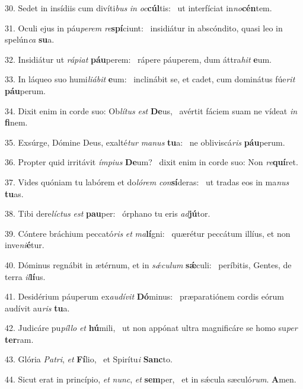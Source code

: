 30. Sedet in insídiis cum divíti\textit{bus} \textit{in} \textit{oc}\textbf{cúl}tis: \ast\  ut interfíciat in\textit{no}\textbf{cén}tem.\

31. Oculi ejus in páu\textit{pe}\textit{rem} \textit{re}\textbf{spí}ciunt: \ast\  insidiátur in abscóndito, quasi leo in spelún\textit{ca} \textbf{su}a.\

32. Insidiátur ut \textit{rá}\textit{pi}\textit{at} \textbf{páu}perem: \ast\  rápere páuperem, dum áttra\textit{hit} \textbf{e}um.\

33. In láqueo suo humi\textit{li}\textit{á}\textit{bit} \textbf{e}um: \ast\  inclinábit se, et cadet, cum dominátus fúe\textit{rit} \textbf{páu}perum.\

34. Dixit enim in corde suo: Ob\textit{lí}\textit{tus} \textit{est} \textbf{De}us, \ast\  avértit fáciem suam ne vídeat \textit{in} \textbf{fi}nem.\

35. Exsúrge, Dómine Deus, exalté\textit{tur} \textit{ma}\textit{nus} \textbf{tu}a: \ast\  ne obliviscá\textit{ris} \textbf{páu}perum.\

36. Propter quid irritávit \textit{ím}\textit{pi}\textit{us} \textbf{De}um? \ast\  dixit enim in corde suo: Non \textit{re}\textbf{quí}ret.\

37. Vides quóniam tu labórem et do\textit{ló}\textit{rem} \textit{con}\textbf{sí}deras: \ast\  ut tradas eos in ma\textit{nus} \textbf{tu}as.\

38. Tibi dere\textit{líc}\textit{tus} \textit{est} \textbf{pau}per: \ast\  órphano tu eris \textit{ad}\textbf{jú}tor.\

39. Cóntere bráchium peccató\textit{ris} \textit{et} \textit{ma}\textbf{lí}gni: \ast\  quærétur peccátum illíus, et non inve\textit{ni}\textbf{é}tur.\

40. Dóminus regnábit in ætérnum, et in \textit{sǽ}\textit{cu}\textit{lum} \textbf{sǽ}culi: \ast\  períbitis, Gentes, de terra \textit{il}\textbf{lí}us.\

41. Desidérium páuperum ex\textit{au}\textit{dí}\textit{vit} \textbf{Dó}minus: \ast\  præparatiónem cordis eórum audívit au\textit{ris} \textbf{tu}a.\

42. Judicáre pu\textit{píl}\textit{lo} \textit{et} \textbf{hú}mili, \ast\  ut non appónat ultra magnificáre se homo su\textit{per} \textbf{ter}ram.\

43. Glória \textit{Pa}\textit{tri}, \textit{et} \textbf{Fí}lio, \ast\  et Spirítu\textit{i} \textbf{Sanc}to.\

44. Sicut erat in princípio, \textit{et} \textit{nunc}, \textit{et} \textbf{sem}per, \ast\  et in sǽcula sæculó\textit{rum}. \textbf{A}men.\

